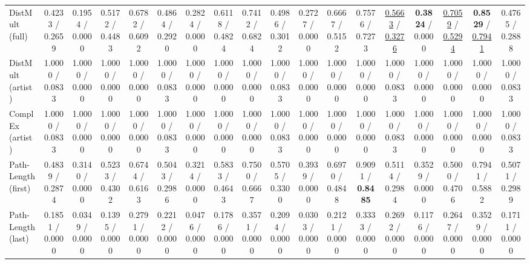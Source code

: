 \begin{table}[ht]
\begin{tabular}{lccccccccccccccccc}
DistMult (full) & 0.4233 / 0.2659 & 0.1954 / 0.0000 & 0.5172 / 0.4483 & 0.6782 / 0.6092 & 0.4864 / 0.2920 & 0.2824 / 0.0000 & 0.6118 / 0.4824 & 0.7412 / 0.6824 & 0.4986 / 0.3012 & 0.2727 / 0.0000 & 0.6667 / 0.5152 & 0.7576 / 0.7273 & \underline{0.5663} / \underline{0.3276} & \textbf{0.3824} / 0.0000 & \underline{0.7059} / \underline{0.5294} & \textbf{0.8529} / \underline{0.7941} & 0.4765 / 0.2888 \\
DistMult (artist) & 1.0000 / 0.0833 & 1.0000 / 0.0000 & 1.0000 / 0.0000 & 1.0000 / 0.0000 & 1.0000 / 0.0833 & 1.0000 / 0.0000 & 1.0000 / 0.0000 & 1.0000 / 0.0000 & 1.0000 / 0.0833 & 1.0000 / 0.0000 & 1.0000 / 0.0000 & 1.0000 / 0.0000 & 1.0000 / 0.0833 & 1.0000 / 0.0000 & 1.0000 / 0.0000 & 1.0000 / 0.0000 & 1.0000 / 0.0833 \\
ComplEx (artist) & 1.0000 / 0.0833 & 1.0000 / 0.0000 & 1.0000 / 0.0000 & 1.0000 / 0.0000 & 1.0000 / 0.0833 & 1.0000 / 0.0000 & 1.0000 / 0.0000 & 1.0000 / 0.0000 & 1.0000 / 0.0833 & 1.0000 / 0.0000 & 1.0000 / 0.0000 & 1.0000 / 0.0000 & 1.0000 / 0.0833 & 1.0000 / 0.0000 & 1.0000 / 0.0000 & 1.0000 / 0.0000 & 1.0000 / 0.0833 \\
Path-Length (first) & 0.4839 / 0.2874 & 0.3140 / 0.0000 & 0.5233 / 0.4302 & 0.6744 / 0.6163 & 0.5043 / 0.2986 & 0.3214 / 0.0000 & 0.5833 / 0.4643 & 0.7500 / 0.6667 & 0.5705 / 0.3300 & 0.3939 / 0.0000 & 0.6970 / 0.4848 & 0.9091 / \textbf{0.8485} & 0.5114 / 0.2984 & 0.3529 / 0.0000 & 0.5000 / 0.4706 & 0.7941 / 0.5882 & 0.5071 / 0.2989 \\
Path-Length (last) & 0.1851 / 0.0000 & 0.0349 / 0.0000 & 0.1395 / 0.0000 & 0.2791 / 0.0000 & 0.2212 / 0.0000 & 0.0476 / 0.0000 & 0.1786 / 0.0000 & 0.3571 / 0.0000 & 0.2094 / 0.0000 & 0.0303 / 0.0000 & 0.2121 / 0.0000 & 0.3333 / 0.0000 & 0.2692 / 0.0000 & 0.1176 / 0.0000 & 0.2647 / 0.0000 & 0.3529 / 0.0000 & 0.1711 / 0.0000 \\
\bottomrule
\end{tabular}
\end{table}